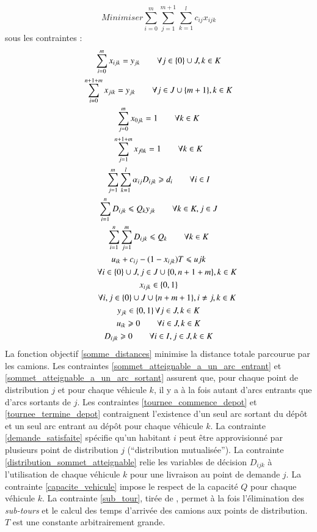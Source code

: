 \documentclass[5p,authoryear]{elsarticle}
\begin{document}
\begin{equation}\label{somme_distances}
Minimiser \sum_{i=0}^{m}\sum_{j=1}^{m+1}\sum_{k=1}^{l} c_{ij} x_{ijk}
\end{equation}
 sous les contraintes :
\begin{gather}
\sum_{i=0}^{m}x_{ijk} = y_{jk}\qquad \forall j\in \{0\} \cup J, k \in K \label{sommet_atteignable_a_un_arc_entrant}\\ 
\sum_{i=0}^{n+1+m}x_{jik} = y_{jk}\qquad \forall j\in J \cup \{m+1\}, k \in K \label{sommet_atteignable_a_un_arc_sortant}\\ 
\sum_{j=0}^{m}x_{0jk} = 1 \qquad \forall k \in K \label{tournee_commence_depot}\\ 
\sum_{j=1}^{n+1+m}x_{j0k} = 1 \qquad \forall k \in K \label{tournee_termine_depot}\\
\sum_{j=1}^{m}\sum_{k=1}^{l} \alpha_{ij}D_{ijk} \geqslant d_{i}\qquad \forall i\in I \label{demande_satisfaite}\\
\sum_{i=1}^{n}D_{ijk} \leqslant Q_{k}y_{jk}\qquad \forall k \in K, j\in J \label{distribution_sommet_atteignable}\\
\sum_{i=1}^{n}\sum_{j=1}^{m}D_{ijk} \leqslant Q_k\qquad \forall k \in K \label{capacite_vehicule}\\
u_{ik} + c_{ij} - (1 - x_{ijk})T \leqslant u{jk} \notag \\
\qquad \forall i \in \{0\} \cup J, j \in J \cup \{0,n+1+m\}, k \in K \label{sub_tour}\\
x_{ijk} \in\left\{0,1\right\} \notag \\
\qquad\forall i,j\in\{0\}\cup J \cup \{n+m+1\}, i \neq j, k \in K \\
y_{jk} \in\left\{0,1\right\} \forall j\in J, k \in K\\ 
u_{ik} \geqslant 0  \qquad\forall i\in J, k \in K\\ 
D_{ijk} \geqslant 0 \qquad\forall i\in I, j\in J, k \in K\\ 
\end{gather}
La fonction objectif \ref{somme_distances} minimise la distance totale parcourue par les camions. Les contraintes \ref{sommet_atteignable_a_un_arc_entrant} et \ref{sommet_atteignable_a_un_arc_sortant} assurent que, pour chaque point de distribution $j$ et pour chaque véhicule $k$, il y a à la fois autant d'arcs entrants que d'arcs sortants de $j$. Les contraintes \ref{tournee_commence_depot} et \ref{tournee_termine_depot} contraignent l'existence d'un seul arc sortant du dépôt et un seul arc entrant au dépôt pour chaque véhicule $k$. La contrainte \ref{demande_satisfaite} spécifie qu'un habitant $i$ peut être approvisionné par plusieurs point de distribution $j$ (\enquote{distribution mutualisée}). La contrainte \ref{distribution_sommet_atteignable} relie les variables de décision $D_{ijk}$ à l'utilisation de chaque véhicule $k$ pour une livraison au point de demande $j$. La contrainte \ref{capacite_vehicule} impose le respect de la capacité $Q$ pour chaque véhicule $k$. La contrainte \ref{sub_tour}, tirée de \cite{ngueveu_effective_2010}, permet à la fois l'élimination des \emph{sub-tours} et le calcul des temps d'arrivée des camions aux points de distribution. $T$ est une constante arbitrairement grande.
\end{document}
